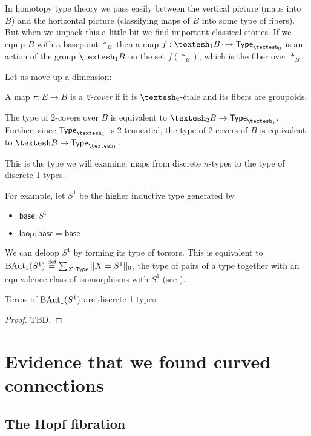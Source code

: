 \documentclass[12pt]{article}
\begin{document}
In homotopy type theory we pass easily between the vertical picture (maps into \(B\)) and the horizontal picture (classifying maps of \(B\) into some type of fibers). But when we unpack this a little bit we find important classical stories. If we equip \(B\) with a basepoint \(*_B\) then a map \(f:\shapeo B \dotto \Type_{\shapez}\) is an action of the group \(\shapeo B\) on the set \(f(*_B)\), which is the fiber over \(*_B\).

Let us move up a dimension:

\begin{mydef}
  A map \(\pi:E\to B\) is a \emph{2-cover} if it is \(\shapet\)-étale and its fibers are groupoids.
\end{mydef}

\begin{mylemma}
  The type of 2-covers over \(B\) is equivalent to \(\shapet B \to \Typeo\). Further, since \(\Typeo\) is 2-truncated, the type of 2-covers of \(B\) is equivalent to \(\shape B\to \Typeo\).
\end{mylemma}

This is the type we will examine: maps from discrete \( n \)-types to the type of discrete 1-types.

For example, let \(S^1\) be the higher inductive type generated by
\begin{itemize}
\item \( \mathsf{base}:S^1 \)
\item \( \mathsf{loop}:\mathsf{base}=\mathsf{base} \)
\end{itemize}

We can deloop \(S^1\) by forming its type of torsors. This is equivalent to \(\mathrm{BAut}_1(S^1)\stackrel{\textup{def}}{=}\sum_{X:\mathsf{Type}}||X=S^1||_0\), the type of pairs of a type together with an equivalence class of isomorphisms with \( S^1 \) (see \cite{buchholtz2023central}). 

\begin{mylemma}Terms of \( \mathrm{BAut}_1(S^1) \) are discrete 1-types.\end{mylemma}\begin{proof} TBD.\end{proof}

\section{Evidence that we found curved connections}

\subsection{The Hopf fibration}
\end{document}
